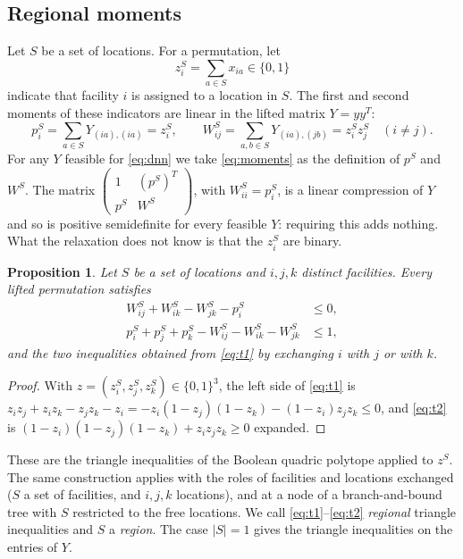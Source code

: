 \documentclass[11pt]{article}
\newtheorem{proposition}{Proposition}
\theoremstyle{remark}
\begin{document}
\subsection{Regional moments}

Let $S$ be a set of locations. For a permutation, let
\[
  z_i^S = \sum_{a\in S} x_{ia} \in\{0,1\}
\]
indicate that facility $i$ is assigned to a location in $S$. The first and second
moments of these indicators are linear in the lifted matrix $Y = yy^T$:
\begin{equation}\label{eq:moments}
  p_i^S = \sum_{a\in S} Y_{(ia),(ia)} = z_i^S, \qquad
  W_{ij}^S = \sum_{a,b\in S} Y_{(ia),(jb)} = z_i^Sz_j^S \quad (i\ne j).
\end{equation}
For any $Y$ feasible for \eqref{eq:dnn} we take \eqref{eq:moments} as the
definition of $p^S$ and $W^S$. The matrix
$\begin{pmatrix}1 & (p^S)^T\\ p^S & W^S\end{pmatrix}$, with $W^S_{ii} = p^S_i$, is
a linear compression of $Y$ and so is positive semidefinite for every feasible
$Y$: requiring this adds nothing. What the relaxation does not know is that the
$z_i^S$ are binary.

\begin{proposition}\label{prop:tri}
Let $S$ be a set of locations and $i,j,k$ distinct facilities. Every lifted
permutation satisfies
\begin{align}
  W_{ij}^S + W_{ik}^S - W_{jk}^S - p_i^S &\le 0, \label{eq:t1}\\
  p_i^S + p_j^S + p_k^S - W_{ij}^S - W_{ik}^S - W_{jk}^S &\le 1, \label{eq:t2}
\end{align}
and the two inequalities obtained from \eqref{eq:t1} by exchanging $i$ with $j$
or with $k$.
\end{proposition}
\begin{proof}
With $z = (z_i^S, z_j^S, z_k^S)\in\{0,1\}^3$, the left side of \eqref{eq:t1} is
$z_iz_j + z_iz_k - z_jz_k - z_i = -z_i(1-z_j)(1-z_k) - (1-z_i)z_jz_k \le 0$, and
\eqref{eq:t2} is $(1-z_i)(1-z_j)(1-z_k) + z_iz_jz_k \ge 0$ expanded.
\end{proof}

These are the triangle inequalities of the Boolean quadric polytope
\cite{padberg} applied to $z^S$. The same construction applies with the roles of
facilities and locations exchanged ($S$ a set of facilities, and $i,j,k$
locations), and at a node of a branch-and-bound tree with $S$ restricted to the
free locations. We call \eqref{eq:t1}--\eqref{eq:t2} \emph{regional} triangle
inequalities and $S$ a \emph{region}. The case $|S| = 1$ gives the triangle
inequalities on the entries of $Y$.
\end{document}
